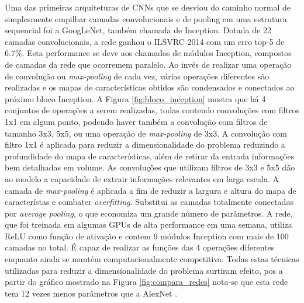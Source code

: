Uma das primeiras arquiteturas de CNNs que se desviou do caminho normal de simplesmente empilhar camadas convolucionais e de pooling em uma estrutura sequencial foi a GoogLeNet, também chamada de Inception. Dotada de 22 camadas convolucionais, a rede ganhou o ILSVRC 2014 com um erro top-5 de $6.7\%$. Esta performance se deve aos chamados de módulos Inception, compostos de camadas da rede que ocorremem paralelo. Ao invés de realizar uma operação de convolução ou \emph{max-pooling} de cada vez, várias operações diferentes são realizadas e os mapas de características obtidos são condensados e conectados ao próximo bloco Inception. A Figura \ref{fig:bloco_inception} mostra que há 4 conjuntos de operações a serem realizadas, todas contendo convoluções com filtros 1x1 em algum ponto, podendo haver também a convolução com filtros de tamanho 3x3, 5x5, ou uma operação de \emph{max-pooling} de 3x3. A convolução com filtro 1x1 é aplicada para reduzir a dimensionalidade do problema reduzindo a profundidade do mapa de características, além de retirar da entrada informações bem detalhadas em volume. As convoluções que utilizam filtros de 3x3 e 5x5 dão ao modelo a capacidade de extrair informações relevantes em larga escala. A camada de \emph{max-pooling} é aplicada a fim de reduzir a largura e altura do mapa de característas e combater \emph{overfitting}. Substitui as camadas totalmente conectadas por \emph{average pooling}, o que economiza um grande número de parâmetros. A rede, que foi treinada em algumas GPUs de alta performance em uma semana, utiliza ReLU como função de ativação e contem 9 módulos Inception com mais de 100 camadas no total. É capaz de realizar as funções das 4 operações diferentes enquanto ainda se mantém computacionalmente competitiva. Todas estas técnicas utilizadas para reduzir a dimensionalidade do problema surtiram efeito, pos a partir do gráfico mostrado na Figura \ref{fig:compara_redes} nota-se que esta rede tem 12 vezes menos parâmetros que a AlexNet \cite{inception}.

